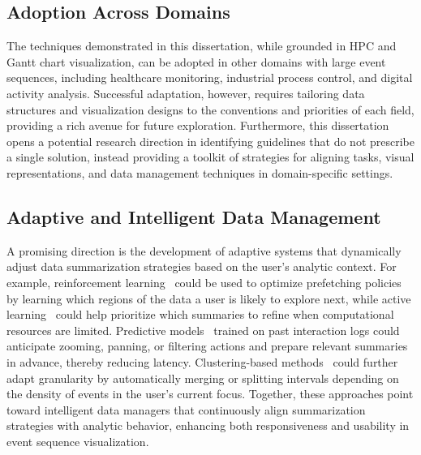 \begin{refsection}
\subsection{Adoption Across Domains}
The techniques demonstrated in this dissertation, while grounded in HPC and Gantt chart visualization, can be adopted in other domains with large event sequences, including healthcare monitoring, industrial process control, and digital activity analysis. Successful adaptation, however, requires tailoring data structures and visualization designs to the conventions and priorities of each field, providing a rich avenue for future exploration. Furthermore, this dissertation opens a potential research direction in identifying guidelines that do not prescribe a single solution, instead providing a toolkit of strategies for aligning tasks, visual representations, and data management techniques in domain-specific settings.

\subsection{Adaptive and Intelligent Data Management}
A promising direction is the development of adaptive systems that dynamically adjust data summarization strategies based on the user’s analytic context. For example, reinforcement learning~\cite{mao2019pensieve} could be used to optimize prefetching policies by learning which regions of the data a user is likely to explore next, while active learning~\cite{ren2021survey} could help prioritize which summaries to refine when computational resources are limited. Predictive models~\cite{canay2024predictive} trained on past interaction logs could anticipate zooming, panning, or filtering actions and prepare relevant summaries in advance, thereby reducing latency. Clustering-based methods~\cite{jain2010data} could further adapt granularity by automatically merging or splitting intervals depending on the density of events in the user's current focus. Together, these approaches point toward intelligent data managers that continuously align summarization strategies with analytic behavior, enhancing both responsiveness and usability in event sequence visualization.


\end{refsection}
